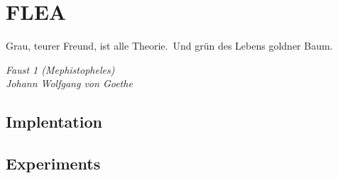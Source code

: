 
\chapter{FLEA}

\epigraph{
	Grau, teurer Freund, ist alle Theorie.\footnotemark\ 
	Und grün des Lebens goldner Baum.
}{\textit{
	Faust 1 (Mephistopheles) \\ Johann Wolfgang von Goethe}}


\section{Implentation}
\section{Experiments}